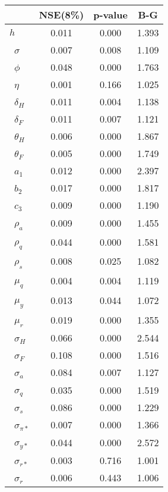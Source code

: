 \begin{tiny}\begin{tabular}{lccc}
\hline
&\textbf{NSE(8\%)}&\textbf{p-value}&\textbf{B-G}\\\hline
\textbf{$ h             $}&0.011&0.000&1.393\\\
\textbf{$ \sigma        $}&0.007&0.008&1.109\\\
\textbf{$ \phi          $}&0.048&0.000&1.763\\\
\textbf{$ \eta          $}&0.001&0.166&1.025\\\
\textbf{$ \delta_{H}    $}&0.011&0.004&1.138\\\
\textbf{$ \delta_{F}    $}&0.011&0.007&1.121\\\
\textbf{$ \theta_{H}    $}&0.006&0.000&1.867\\\
\textbf{$ \theta_{F}    $}&0.005&0.000&1.749\\\
\textbf{$ a_{1}         $}&0.012&0.000&2.397\\\
\textbf{$ b_{2}         $}&0.017&0.000&1.817\\\
\textbf{$ c_{3}         $}&0.009&0.000&1.190\\\
\textbf{$ \rho_{a}      $}&0.009&0.000&1.455\\\
\textbf{$ \rho_{q}      $}&0.044&0.000&1.581\\\
\textbf{$ \rho_{s}      $}&0.008&0.025&1.082\\\
\textbf{$ \mu_{q}       $}&0.004&0.004&1.119\\\
\textbf{$ \mu_{y}       $}&0.013&0.044&1.072\\\
\textbf{$ \mu_{r}       $}&0.019&0.000&1.355\\\
\textbf{$ \sigma_{H}    $}&0.066&0.000&2.544\\\
\textbf{$ \sigma_{F}    $}&0.108&0.000&1.516\\\
\textbf{$ \sigma_{a}    $}&0.084&0.007&1.127\\\
\textbf{$ \sigma_{q}    $}&0.035&0.000&1.519\\\
\textbf{$ \sigma_{s}    $}&0.086&0.000&1.229\\\
\textbf{$ \sigma_{\pi*} $}&0.007&0.000&1.366\\\
\textbf{$ \sigma_{y*}   $}&0.044&0.000&2.572\\\
\textbf{$ \sigma_{r*}   $}&0.003&0.716&1.001\\\
\textbf{$ \sigma_{r}    $}&0.006&0.443&1.006\\\hline
\end{tabular}
\end{tiny}